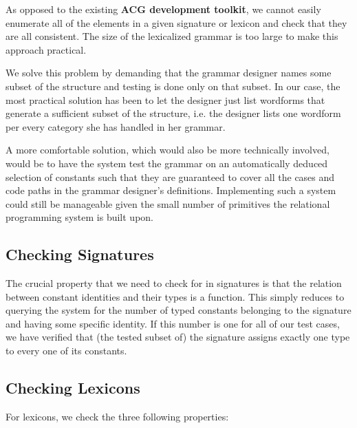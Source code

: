 As opposed to the existing \textbf{ACG development toolkit}, we cannot
easily enumerate all of the elements in a given signature or lexicon and
check that they are all consistent. The size of the lexicalized grammar
is too large to make this approach practical.

We solve this problem by demanding that the grammar designer names some
subset of the structure and testing is done only on that subset. In our
case, the most practical solution has been to let the designer just list
wordforms that generate a sufficient subset of the structure, i.e. the
designer lists one wordform per every category she has handled in her
grammar.

A more comfortable solution, which would also be more technically
involved, would be to have the system test the grammar on an
automatically deduced selection of constants such that they are
guaranteed to cover all the cases and code paths in the grammar
designer's definitions. Implementing such a system could still be
manageable given the small number of primitives the relational
programming system is built upon.

\subsection{Checking Signatures}
\label{ssec:check-sig}

The crucial property that we need to check for in signatures is that the
relation between constant identities and their types is a function. This
simply reduces to querying the system for the number of typed constants
belonging to the signature and having some specific identity. If this
number is one for all of our test cases, we have verified that (the
tested subset of) the signature assigns exactly one type to every one of
its constants.

\subsection{Checking Lexicons}

For lexicons, we check the three following properties:

